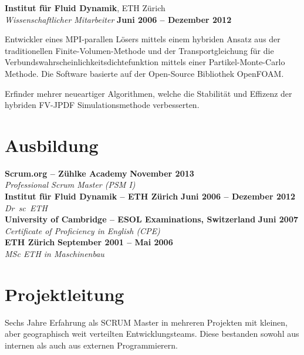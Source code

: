\documentclass[line,11pt,a4paper]{../resume}
\begin{document}
\begin{resume}
\textbf{Institut für Fluid Dynamik}, ETH Zürich\\\vspace{1mm}%
\textsl{Wissenschaftlicher Mitarbeiter} \hfill \textbf{Juni 2006 -- Dezember 2012}\\
\vspace{-4mm}%
\begin{list2}
  \item Entwickler eines MPI-parallen Lösers mittels einem hybriden Ansatz aus
    der traditionellen Finite-Volumen-Methode und der Transportgleichung für
    die Verbundswahrscheinlichkeitsdichtefunktion mittels einer
    Partikel-Monte-Carlo Methode. Die Software basierte auf der Open-Source
    Bibliothek OpenFOAM.

  \item Erfinder mehrer neueartiger Algorithmen, welche die Stabilität und
    Effizenz der hybriden FV-JPDF Simulationsmethode verbesserten.
\end{list2}

\section{\mysidestyle Ausbildung}\vspace{2mm}

\textbf{Scrum.org -- Zühlke Academy} \hfill \textbf{November 2013}\\
\vspace{1mm}%
\textsl{Professional Scrum Master (PSM I)}\\
\vspace{-1mm}%
%
\textbf{Institut für Fluid Dynamik -- ETH Zürich} \hfill \textbf{Juni 2006 -- Dezember 2012}\\
\vspace{1mm}%
\textsl{Dr\ sc\ ETH}\\
\vspace{-1mm}%
%
\textbf{University of Cambridge -- ESOL Examinations, Switzerland} \hfill \textbf{Juni 2007}\\
\vspace{1mm}%
\textsl{Certificate of Proficiency in English (CPE)}\\
\vspace{-1mm}%
%
\textbf{ETH Zürich} \hfill \textbf{September 2001 -- Mai 2006}\\
\vspace{1mm}%
\textsl{MSc ETH in Maschinenbau}

\section{\mysidestyle Projektleitung}\vspace{6mm}
\begin{list2}
  \item Sechs Jahre Erfahrung als SCRUM Master in mehreren Projekten mit
    kleinen, aber geographisch weit verteilten Entwicklungsteams. Diese
    bestanden sowohl aus internen als auch aus externen Programmierern.


\end{list2}
\end{resume}
\end{document}
